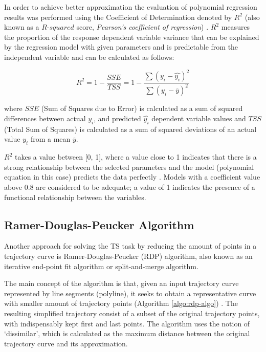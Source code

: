 In order to achieve better approximation the evaluation of polynomial regression results was performed using the Coefficient of Determination denoted by $R^2$ (also known as a $R$-$squared$ score, \textit{Pearson's coefficient of regression}) \cite{inbook:stats}. $R^2$ measures the proportion of the response dependent variable variance that can be explained by the regression model with given parameters and is predictable from the independent variable and can be calculated as follows: 

\begin{equation}\label{eq:r_sq}
	R^2 = 1 - \frac{SSE}{TSS} = 1 - \frac{\sum{(y_i - \hat{y_i})^2}}{\sum{(y_i - \overline{y})^2}}
\end{equation}

where $SSE$ (Sum of Squares due to Error) is calculated as a sum of squared differences between actual $y_i$, and predicted $\hat{y_i}$ dependent variable values and $TSS$ (Total Sum of Squares) is calculated as a sum of squared deviations of an actual value $y_i$ from a mean $\overline{y}$.

$R^2$ takes a value between [0, 1], where a value close to 1 indicates that there is a strong relationship between the selected parameters and the model (polynomial equation in this case) predicts the data perfectly \cite{online:reg_r_interpr}. Models with a coefficient value above 0.8 are considered to be adequate; a value of 1 indicates the presence of a functional relationship between the variables.

\subsection{Ramer-Douglas-Peucker Algorithm}

Another approach for solving the TS task by reducing the amount of points in a trajectory curve is Ramer-Douglas-Peucker (RDP) algorithm, also known as an iterative end-point fit algorithm or split-and-merge algorithm.

The main concept of the algorithm is that, given an input trajectory curve represented by line segments (polyline), it seeks to obtain a representative curve with smaller amount of trajectory points (Algorithm \ref{algo:rdp-algo}) \cite{online:rdp_algo_wiki}. The resulting simplified trajectory consist of a subset of the original trajectory points, with indispensably kept first and last points. The algorithm uses the notion of `dissimilar', which is calculated as the maximum distance between the original trajectory curve and its approximation.

